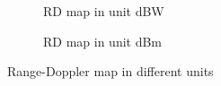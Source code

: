 \documentclass[12pt,DIV14,BCOR12mm,a4paper,footinclude=false,headinclude,parskip=half-,twoside,openright,cleardoublepage=empty,toc=index,bibliography=totoc,listof=totoc]{scrreprt}
\numberwithin{equation}{chapter}
\begin{document}
\begin{figure}[t]
    \begin{subfigure}{0.45\textwidth}
        \centering
        \caption{RD map in unit dBW}
        \label{1r_empty_dBW}
    \end{subfigure}\hspace{0.5cm}
    \begin{subfigure}{0.45\textwidth}
        \centering
        \caption{RD map in unit dBm}
        \label{1r_empty_dBm}
    \end{subfigure}
    \caption{Range-Doppler map in different units}
    \label{range doppler map in different units}
\end{figure}
\end{document}

